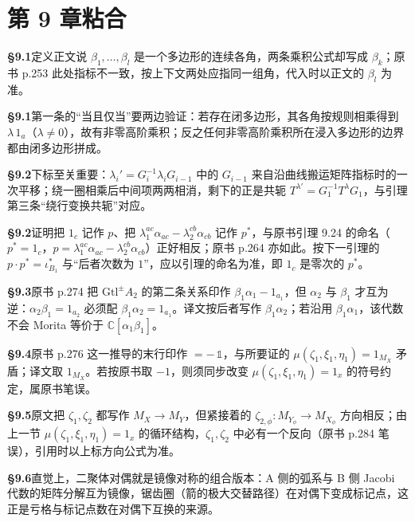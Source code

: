 \section*{第 9 章\quad 粘合}
\noindent\textbf{§9.1}\quad 定义正文说 $\beta_1,\ldots,\beta_l$ 是一个多边形的连续各角，两条乘积公式却写成 $\beta_k$；原书 p.253 此处指标不一致，按上下文两处应指同一组角，代入时以正文的 $\beta_l$ 为准。\par\medskip
\noindent\textbf{§9.1}\quad 第一条的“当且仅当”要两边验证：若存在闭多边形，其各角按规则相乘得到 $\lambda\,1_a$（$\lambda\ne0$），故有非零高阶乘积；反之任何非零高阶乘积所在浸入多边形的边界都由闭多边形拼成。\par\medskip
\noindent\textbf{§9.2}\quad 下标至关重要：$\lambda_i'=G_i^{-1}\lambda_iG_{i-1}$ 中的 $G_{i-1}$ 来自沿曲线搬运矩阵指标时的一次平移；绕一圈相乘后中间项两两相消，剩下的正是共轭 $T^{\lambda'}=G_1^{-1}T^{\lambda}G_1$，与引理第三条“绕行变换共轭”对应。\par\medskip
\noindent\textbf{§9.2}\quad 证明把 $1_c$ 记作 $p$、把 $\lambda_1^{ac}\alpha_{ac}-\lambda_2^{cb}\alpha_{cb}$ 记作 $p^*$，与原书引理 9.24 的命名（$p^*=1_c$，$p=\lambda_1^{ac}\alpha_{ac}-\lambda_2^{cb}\alpha_{cb}$）正好相反；原书 p.264 亦如此。按下一引理的 $p\cdot p^*=\iota^*_{B_1}$ 与“后者次数为 $1$”，应以引理的命名为准，即 $1_c$ 是零次的 $p^*$。\par\medskip
\noindent\textbf{§9.3}\quad 原书 p.274 把 $\mathrm{Gtl}^{\pm}A_2$ 的第二条关系印作 $\beta_1\alpha_1-1_{a_1}$，但 $\alpha_2$ 与 $\beta_1$ 才互为逆：$\alpha_2\beta_1=1_{a_2}$ 必须配 $\beta_1\alpha_2=1_{a_1}$。译文按后者写作 $\beta_1\alpha_2$；若沿用 $\beta_1\alpha_1$，该代数不会 Morita 等价于 $\mathbb C[\alpha_1\beta_1]$。\par\medskip
\noindent\textbf{§9.4}\quad 原书 p.276 这一推导的末行印作 $=-\,\mathbb{1}$，与所要证的 $\mu(\zeta_1,\xi_1,\eta_1)=1_{M_X}$ 矛盾；译文取 $1_{M_X}$。若按原书取 $-1$，则须同步改变 $\mu(\zeta_1,\xi_1,\eta_1)=1_x$ 的符号约定，属原书笔误。\par\medskip
\noindent\textbf{§9.5}\quad 原文把 $\zeta_1,\zeta_2$ 都写作 $M_X\to M_Y$，但紧接着的 $\zeta_{2,\phi}:M_{Y_\phi}\to M_{X_\phi}$ 方向相反；由上一节 $\mu(\zeta_1,\xi_1,\eta_1)=1_x$ 的循环结构，$\zeta_1,\zeta_2$ 中必有一个反向（原书 p.284 笔误），引用时以上标方向公式为准。\par\medskip
\noindent\textbf{§9.6}\quad 直觉上，二聚体对偶就是镜像对称的组合版本：A 侧的弧系与 B 侧 Jacobi 代数的矩阵分解互为镜像，锯齿圈（箭的极大交替路径）在对偶下变成标记点，这正是亏格与标记点数在对偶下互换的来源。\par\medskip

